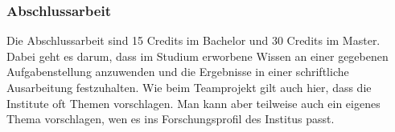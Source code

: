 \begin{multicols}{2}
	\subsubsection{Abschlussarbeit}
	Die Abschlussarbeit sind 15 Credits im Bachelor und 30 Credits im Master. Dabei geht es darum, dass im Studium erworbene Wissen an einer gegebenen Aufgabenstellung anzuwenden und  die Ergebnisse in einer schriftliche Ausarbeitung festzuhalten. Wie beim Teamprojekt gilt auch hier, dass die Institute oft Themen vorschlagen.  Man kann aber teilweise auch ein eigenes Thema vorschlagen, wen es ins Forschungsprofil des Institus passt. 

\end{multicols}